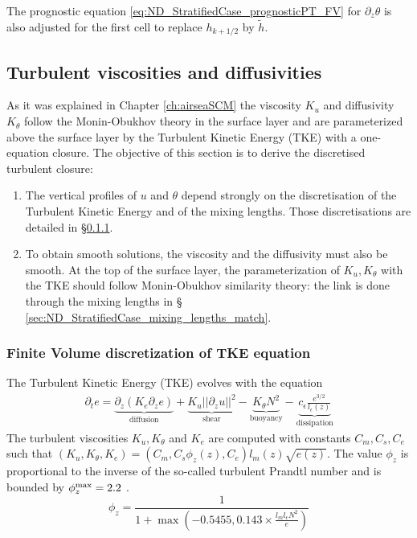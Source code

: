 The prognostic equation \eqref{eq:ND_StratifiedCase_prognosticPT_FV}
for $\partial_z \theta$ is also adjusted for the first
cell to replace $h_{k+1/2}$ by $\widetilde{h}$.
\subsection{Turbulent viscosities and diffusivities}
\label{sec:ND_StratifiedCase_turbulentVisc}
As it was explained in Chapter \ref{ch:airseaSCM} the
viscosity $K_u$ and diffusivity $K_\theta$ follow the
Monin-Obukhov theory in the surface layer and are parameterized
above the surface layer by the Turbulent Kinetic Energy (TKE) with a
one-equation closure.
The objective of this section is to derive the discretised
turbulent closure:
\begin{enumerate}
\item
The vertical profiles of $u$ and $\theta$ depend strongly on
the discretisation of the Turbulent Kinetic Energy
and of the mixing lengths. Those discretisations are detailed in
\S \ref{sec:ND_StratifiedCase_TKE}.
\item To obtain smooth solutions, the viscosity and
the diffusivity must also be smooth.
At the top of the surface layer, the parameterization
of $K_u, K_\theta$ with the TKE should follow Monin-Obukhov
similarity theory:
the link is done through the mixing lengths in \S
\ref{sec:ND_StratifiedCase_mixing_lengths_match}.
\end{enumerate}
\subsubsection{Finite Volume discretization of TKE equation}
\label{sec:ND_StratifiedCase_TKE}
The Turbulent Kinetic Energy (TKE) evolves with the equation
\begin{equation}
\label{eq:ND_StratifiedCase_TKE}
    \begin{aligned}
    \partial_t e =
    \underbrace{\partial_z \left(K_e
    \partial_z e\right)}_{\text{diffusion}}
    + \underbrace{K_u ||\partial_z u||^2}_{\text{shear}} 
    - \underbrace{K_{\theta} N^2 }_{\text{buoyancy}}
    - \underbrace{c_{\epsilon}
    \frac{e^{3/2}}{l_{\epsilon}(z)}}_{\text{dissipation}}
    \end{aligned}
\end{equation}
The turbulent viscosities $K_u, K_{\theta}$ and $K_e$ are computed
with constants $C_m, C_s, C_e$ such that $(K_u, K_\theta, K_e) = (C_m , C_s \phi_z(z), C_e)l_m(z)
\sqrt{e(z)}$. The value $\phi_z$ is proportional to the inverse
of the so-called turbulent Prandtl number and is bounded by
$\phi_z^{\rm max} = 2.2$ \citep{lemarie_simplified_2021}.
\begin{equation}
\phi_z= \frac{1}{1+ \max\left(-0.5455,
	0.143\times\frac{ l_m l_\epsilon N^2}{e}\right)}
\end{equation}
